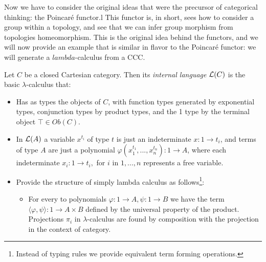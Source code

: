 Now we have to consider the original ideas that were the precursor of categorical thinking: the Poincaré functor.l This functor is, in short,  sees how to consider a group within a topology, and see that we can infer group morphism from topologies homeomorphism. This is the original idea behind the functors, and we will now provide an example that is similar in flavor to the Poincaré functor: we will generate a $lambda$-calculus from a CCC.\\ 



\begin{definition}
  Let $C$ be a closed Cartesian category. Then its \emph{internal language} $\mathcal{L} (C)$ is the basic $\lambda$-calculus that:
  \begin{itemize}
  \item Has as types the objects of $C$, with function types generated by exponential types, conjunction types by product types, and the 1 type by the terminal object $\top \in Ob(C)$.%
  \item In $\mathcal{L}(A)$ a variable $x^{t_i}$ of type $t$ is just an indeterminate  $x:1 \to t_i$, and terms of type $A$ are just a polynomial $\varphi(x_1^{t_1},...,x_n^{t_n}):1 \to A$, where each indeterminate $x_i: 1 \to t_i,$ for $i$ in $1,...,n$ represents a free variable.
  \item Provide the structure of simply lambda calculus as follows\footnote{Instead of typing rules we provide equivalent term forming operations.}:
    \begin{itemize}
    \item For every to polynomials $\varphi: 1 \to A, \psi: 1\to B$ we have the term $\langle \varphi, \psi \rangle: 1 \to A\times B$ defined by the universal property of the product. Projections $\pi_i$ in $\lambda$-calculus are found by composition with the projection in the context of category.

\end{itemize}
\end{itemize}
\end{definition}
